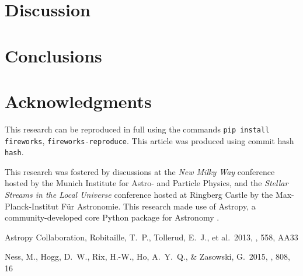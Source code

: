 \documentclass[useAMS,usenatbib]{mn2e}
\begin{document}



\section{Discussion}





\section{Conclusions}

% 


\section*{Acknowledgments}
This research can be reproduced in full using the commands \texttt{pip install fireworks},
\texttt{fireworks-reproduce}. This article was produced using commit hash \texttt{hash}.

This research was fostered by discussions at the \textit{New Milky Way}
conference hosted by the Munich Institute for Astro- and Particle Physics, and
the \textit{Stellar Streams in the Local Universe} conference hosted at Ringberg
Castle by the Max-Planck-Institut F\"ur Astronomie. This research made use of 
Astropy, a community-developed core Python package for Astronomy \citep{astropy}.

\begin{thebibliography}{99}
 Astropy Collaboration, Robitaille, T.~P., Tollerud, E.~J., et al.\ 2013, \aap, 558, AA33

 Ness, M., Hogg, D.~W., 
Rix, H.-W., Ho, A.~Y.~Q., \& Zasowski, G.\ 2015, \apj, 808, 16 
\end{thebibliography}
\end{document}

